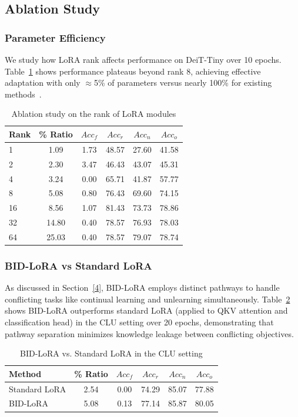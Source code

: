 \subsection{Ablation Study}
\label{7.0}
\subsubsection{Parameter Efficiency}
\label{7.1}
We study how LoRA rank affects performance on DeiT-Tiny over 10 epochs. Table~\ref{tab:rank_ablation} shows performance plateaus beyond rank 8, achieving effective adaptation with only $\approx$5\% of parameters versus nearly 100\% for existing methods~\cite{shibata2021learning,adhikari2025unlearning,huang2025unified,chatterjee2024unified,liu2022continual}.
\begin{table}[!htbp]
\centering
\caption{Ablation study on the rank of LoRA modules}
\begin{tabular}{lccccc}
\toprule
Rank & \% Ratio & $Acc_f$ & $Acc_r$ & $Acc_n$ & $Acc_o$ \\
\midrule
1  & 1.09 & 1.73 & 48.57 & 27.60 & 41.58 \\
2  & 2.30 & 3.47 & 46.43 & 43.07 & 45.31 \\
4  & 3.24 & 0.00 & 65.71 & 41.87 & 57.77 \\
\rowcolor{orange!20}
8  & 5.08 & 0.80 & 76.43 & 69.60 & 74.15 \\
16 & 8.56 & 1.07 & 81.43 & 73.73 & 78.86 \\
32 & 14.80 & 0.40 & 78.57 & 76.93 & 78.03 \\
64 & 25.03 & 0.40 & 78.57 & 79.07 & 78.74 \\
\bottomrule
\end{tabular}
\label{tab:rank_ablation}
\end{table}

\subsubsection{BID-LoRA vs Standard LoRA}
\label{7.2}
As discussed in Section~\ref{4}, BID-LoRA employs distinct pathways to handle conflicting tasks like continual learning and unlearning simultaneously. Table~\ref{tab:bid_vs_standard} shows BID-LoRA outperforms standard LoRA (applied to QKV attention and classification head) in the CLU setting over 20 epochs, demonstrating that pathway separation minimizes knowledge leakage between conflicting objectives.

\begin{table}[!htbp]
\centering
\caption{BID-LoRA vs. Standard LoRA in the CLU setting}
\begin{tabular}{lccccc}
\toprule
Method & \% Ratio & $Acc_f$ & $Acc_r$ & $Acc_n$ & $Acc_o$ \\
\midrule
Standard LoRA & 2.54 & 0.00 & 74.29 & 85.07 & 77.88 \\
\rowcolor{orange!20}
BID-LoRA & 5.08 & 0.13 & 77.14 & 85.87 & 80.05 \\
\bottomrule
\end{tabular}
\label{tab:bid_vs_standard}
\end{table}

